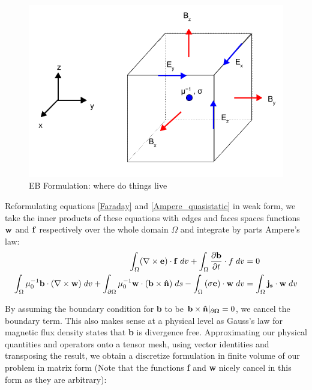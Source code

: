 \documentclass[twoside]{article}
\begin{document}
\begin{figure}[!ht]
\centering
\includegraphics[scale=0.4]{./figures/EB_formulation.png}
\caption{EB Formulation: where do things live}
\label{EB_formulation}
\end{figure}


Reformulating equations \ref{Faraday} and \ref{Ampere_quasistatic} in weak form, we take the inner products of these equations with edges and faces spaces functions ${\bf w}$ and ${\bf f}$ respectively over the whole domain $\Omega$ and integrate by parts Ampere's law:
\begin{align}
\int_\Omega (\nabla \times {\bf e}) \cdot {\bf f} \; dv + \int_\Omega {\frac{\bf{\partial b}}{\partial t} \cdot f} \; dv &= 0\\
\int_\Omega \mu_0^{-1}{\bf b} \cdot ({\bf \nabla \times w}) \; dv + \int_{\partial \Omega} \mu_0^{-1}{\bf w} \cdot ({\bf b \times \hat n}) \; ds
-  \int_\Omega {\bf (\sigma e) \cdot w} \; dv &= \int_\Omega {\bf {j_s} \cdot w} \; dv
\end{align}

By assuming the boundary condition for \textbf{b} to be ${\bf b \times \hat n |_{\partial \Omega}}=0$, we cancel the boundary term. This also makes sense at a physical level as Gauss's law for magnetic flux density states that \textbf{b} is divergence free. Approximating our physical quantities and operators onto a tensor mesh, using vector identities and transposing the result, we obtain a discretize formulation in finite volume of our problem in matrix form (Note that the functions \textbf{f} and \textbf{w} nicely cancel in this form as they are arbitrary):
\end{document}
